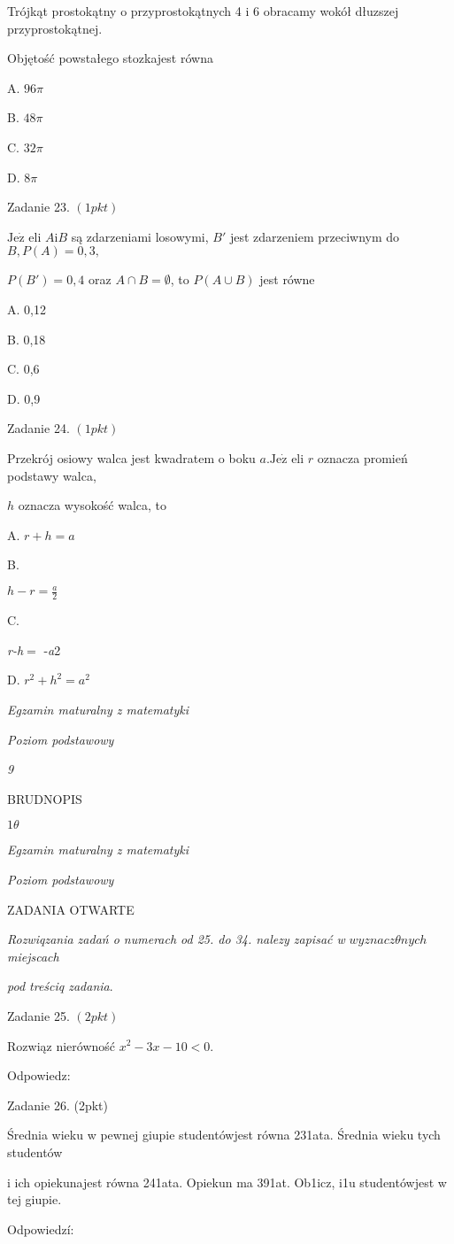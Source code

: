 \documentclass[a4paper,12pt]{article}
\begin{document}
Trójkąt prostokątny o przyprostokątnych 4 i 6 obracamy wokół dłuzszej przyprostokątnej.

Objętość powstałego stozkajest równa

A. $ 96\pi$

B. $ 48\pi$

C. $ 32\pi$

D. $ 8\pi$

Zadanie 23. $(1pkt)$

$\mathrm{J}\mathrm{e}\dot{\mathrm{z}}$ eli $A \mathrm{i} B$ są zdarzeniami losowymi, $B'$ jest zdarzeniem przeciwnym do $B, P(A)=0,3,$

$P(B')=0,4$ oraz $ A\cap B=\emptyset$, to $P(A\cup B)$ jest równe

A. 0,12

B. 0,18

C. 0,6

D. 0,9

Zadanie 24. $(1pkt)$

Przekrój osiowy walca jest kwadratem o boku $a. \mathrm{J}\mathrm{e}\dot{\mathrm{z}}$ eli $r$ oznacza promień podstawy walca,

$h$ oznacza wysokość walca, to

A. $r+h=a$

B.

$h-r=\displaystyle \frac{a}{2}$

C.

{\it r-h}$=$ -{\it a}2

D. $r^{2}+h^{2}=a^{2}$





{\it Egzamin maturalny z matematyki}

{\it Poziom podstawowy}

{\it 9}

BRUDNOPIS





$ 1\theta$

{\it Egzamin maturalny z matematyki}

{\it Poziom podstawowy}

ZADANIA OTWARTE

{\it Rozwiqzania zadań o numerach od 25. do 34. nalezy zapisać w} $wyznacz\theta nych$ {\it miejscach}

{\it pod treściq zadania}.

Zadanie 25. $(2pkt)$

Rozwiąz nierówność $x^{2}-3x-10<0.$

Odpowiedz:

Zadanie 26. (2pkt)

Średnia wieku w pewnej giupie studentówjest równa 231ata. Średnia wieku tych studentów

i ich opiekunajest równa 241ata. Opiekun ma 391at. Ob1icz, i1u studentówjest w tej giupie.

Odpowiedzí:
\end{document}
